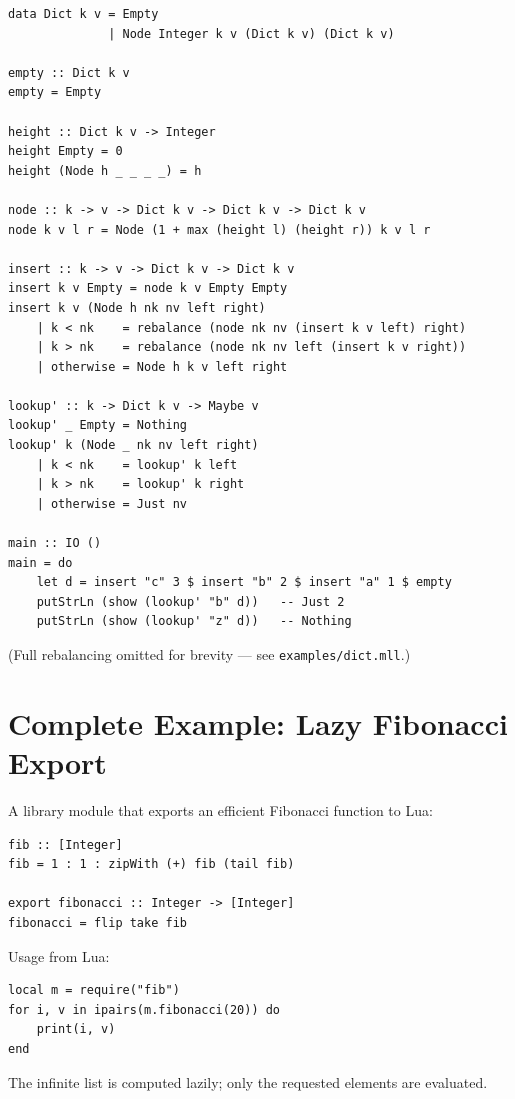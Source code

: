 \documentclass[11pt,a4paper]{article}
\begin{document}
\begin{lstlisting}
data Dict k v = Empty
              | Node Integer k v (Dict k v) (Dict k v)

empty :: Dict k v
empty = Empty

height :: Dict k v -> Integer
height Empty = 0
height (Node h _ _ _ _) = h

node :: k -> v -> Dict k v -> Dict k v -> Dict k v
node k v l r = Node (1 + max (height l) (height r)) k v l r

insert :: k -> v -> Dict k v -> Dict k v
insert k v Empty = node k v Empty Empty
insert k v (Node h nk nv left right)
    | k < nk    = rebalance (node nk nv (insert k v left) right)
    | k > nk    = rebalance (node nk nv left (insert k v right))
    | otherwise = Node h k v left right

lookup' :: k -> Dict k v -> Maybe v
lookup' _ Empty = Nothing
lookup' k (Node _ nk nv left right)
    | k < nk    = lookup' k left
    | k > nk    = lookup' k right
    | otherwise = Just nv

main :: IO ()
main = do
    let d = insert "c" 3 $ insert "b" 2 $ insert "a" 1 $ empty
    putStrLn (show (lookup' "b" d))   -- Just 2
    putStrLn (show (lookup' "z" d))   -- Nothing
\end{lstlisting}

(Full rebalancing omitted for brevity --- see \texttt{examples/dict.mll}.)

\section{Complete Example: Lazy Fibonacci Export}

A library module that exports an efficient Fibonacci function to Lua:

\begin{lstlisting}
fib :: [Integer]
fib = 1 : 1 : zipWith (+) fib (tail fib)

export fibonacci :: Integer -> [Integer]
fibonacci = flip take fib
\end{lstlisting}

Usage from Lua:

\begin{lstlisting}[language={}]
local m = require("fib")
for i, v in ipairs(m.fibonacci(20)) do
    print(i, v)
end
\end{lstlisting}

The infinite list is computed lazily; only the requested elements are
evaluated.
\end{document}
